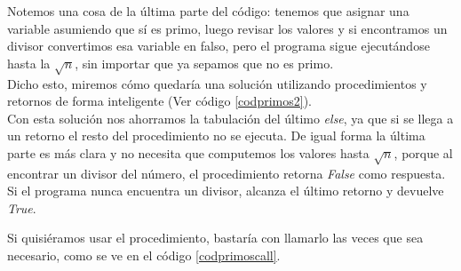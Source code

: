 

\newpage

Notemos una cosa de la última parte del código: tenemos que asignar una variable asumiendo que sí es primo, luego revisar los valores y si encontramos un divisor convertimos esa variable en falso, pero el programa sigue ejecutándose hasta la $\sqrt{n}$, sin importar que ya sepamos que no es primo. \\

Dicho esto, miremos cómo quedaría una solución utilizando procedimientos y retornos de forma inteligente (Ver código \ref{codprimos2}). \\



Con esta solución nos ahorramos la tabulación del último \emph{else}, ya que si se llega a un retorno el resto del procedimiento no se ejecuta. De igual forma la última parte es más clara y no necesita que computemos los valores hasta $\sqrt{n}$, porque al encontrar un divisor del número, el procedimiento retorna \emph{False} como respuesta. Si el programa nunca encuentra un divisor, alcanza el último retorno y devuelve \emph{True}.

Si quisiéramos usar el procedimiento, bastaría con llamarlo las veces que sea necesario, como se ve en el código \ref{codprimoscall}.

\newpage




